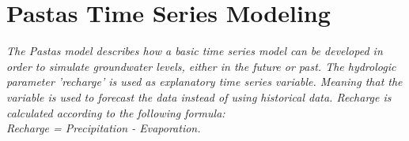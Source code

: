 \chapter{Pastas Time Series Modeling}


\emph{The Pastas model describes how a basic time series model can be developed in order to simulate groundwater levels, either in the future or past. The hydrologic parameter 'recharge' is used as explanatory time series variable. Meaning that the variable is used to forecast the data instead of using historical data. Recharge is calculated according to the following formula: \\
Recharge = Precipitation - Evaporation.}


